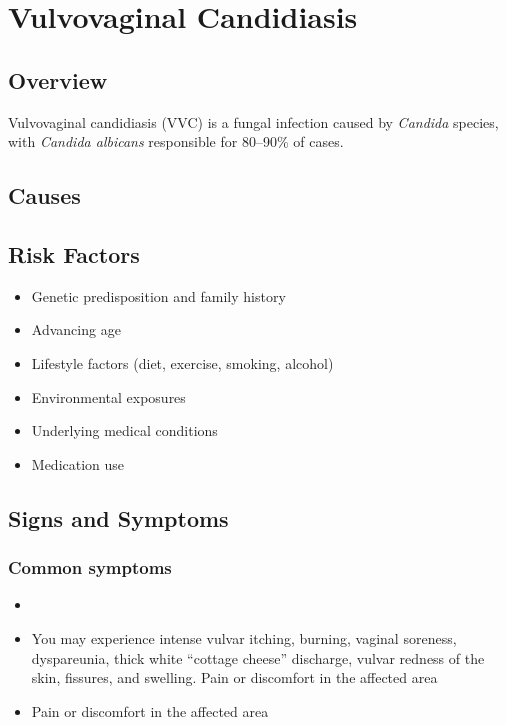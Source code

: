 \chapter{Vulvovaginal Candidiasis}
\label{sec:Vulvovaginal Candidiasis}

\section{Overview}
Vulvovaginal candidiasis (VVC) is a fungal infection caused by \textit{Candida} species, with \textit{Candida albicans} responsible for 80--90\% of cases.
\section{Causes}
\section{Risk Factors}

\begin{itemize}[noitemsep]
  \item Genetic predisposition and family history
  \item Advancing age
  \item Lifestyle factors (diet, exercise, smoking, alcohol)
  \item Environmental exposures
  \item Underlying medical conditions
  \item Medication use
\end{itemize}
\section{Signs and Symptoms}

\subsection{Common symptoms}
\begin{itemize}[noitemsep]
  \item \item You may experience intense vulvar itching, burning, vaginal soreness, dyspareunia, thick white ``cottage cheese'' discharge, vulvar redness of the skin, fissures, and swelling. Pain or discomfort in the affected area    \item Pain or discomfort in the affected area
  \end{itemize}

